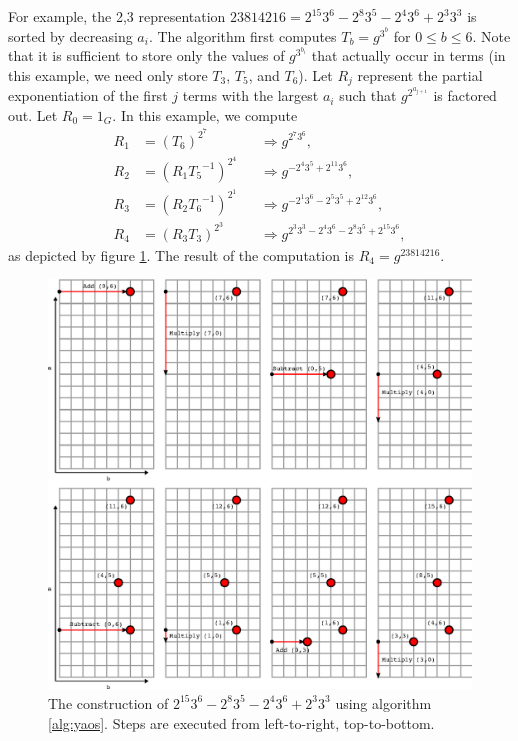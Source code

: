 \documentclass{ucalgthes1}
\theoremstyle{definition}
\begin{document}
For example, the 2,3 representation $23814216 = 2^{15} 3^6 - 2^8 3^5 - 2^4 3^6 + 2^3 3^3$ is sorted by decreasing $a_i$.  The algorithm first computes $T_b = g^{3^b}$ for $0 \le b \le 6$.  Note that it is sufficient to store only the values of $g^{3^{b_i}}$ that actually occur in terms (in this example, we need only store $T_3$, $T_5$, and $T_6$).  Let $R_j$ represent the partial exponentiation of the first $j$ terms with the largest $a_i$ such that $g^{2^{a_{j+1}}}$ is factored out.  Let $R_0 = 1_G$.  In this example, we compute 
\begin{align*}
	R_1 &= \left( T_6 \right)^{2^7} &&\Rightarrow g^{2^7 3^6}, \\
	R_2 &= \left( R_1 {T_5}^{-1} \right)^{2^4} &&\Rightarrow g^{-2^4 3^5 + 2^{11} 3^6}, \\
	R_3 &= \left( R_2 {T_6}^{-1} \right)^{2^1} &&\Rightarrow g^{-2^1 3^6 -2^5 3^5 + 2^{12} 3^6}, \\
	R_4 &= \left( R_3 T_3 \right) ^ {2^3} &&\Rightarrow g^{2^3 3^3 -2^4 3^6 -2^8 3^5 + 2^{15} 3^6},
\end{align*}
as depicted by figure \ref{fig:yao1}.  The result of the computation is $R_4 = g^{23814216}$.  

\begin{figure}[H]
\centering
\includegraphics{yao1}
\caption{The construction of $2^{15} 3^6 - 2^8 3^5 - 2^4 3^6 + 2^3 3^3$ using algorithm \ref{alg:yaos}.  Steps are executed from left-to-right, top-to-bottom.}
\label{fig:yao1}
\end{figure}
\end{document}

